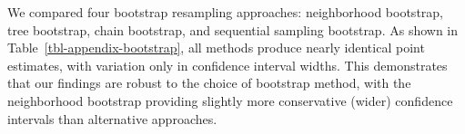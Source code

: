 \documentclass[
  12pt,
  letterpaper,
  DIV=11,
  numbers=noendperiod]{scrartcl}
\theoremstyle{plain}
\theoremstyle{definition}
\begin{document}
{We compared four bootstrap resampling approaches: neighborhood
bootstrap, tree bootstrap, chain bootstrap, and sequential sampling
bootstrap. As shown in Table~\ref{tbl-appendix-bootstrap}, all methods
produce nearly identical point estimates, with variation only in
confidence interval widths. This demonstrates that our findings are
robust to the choice of bootstrap method, with the neighborhood
bootstrap providing slightly more conservative (wider) confidence
intervals than alternative approaches.

\begin{table}

\caption{\label{tbl-appendix-bootstrap}Sensitivity Analysis: Bootstrap
Method Comparison. All estimates use SS weights, N=980,000, and MBSU
(Moderate) adjustment. Source: Authors' Own Work.}

\centering{

\centering\begingroup\fontsize{8}{10}\selectfont

}
\end{table}}
\end{document}
